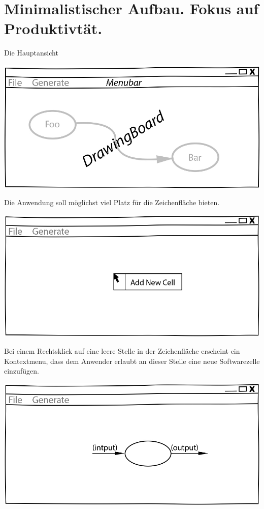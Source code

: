 \documentclass[a4paper,12pt,oneside]{book}
\begin{document}
\section{Minimalistischer Aufbau. Fokus auf Produktivtät.}
\label{sec:orgheadline22}

Die Hauptansicht

\includegraphics[width=.9\linewidth]{./img/MainCrop.jpg}

Die Anwendung soll möglichst viel Platz für die Zeichenfläche
bieten.

\includegraphics[width=.9\linewidth]{./img/ContextMenu.jpg}

Bei einem Rechtsklick auf eine leere Stelle in der Zeichenfläche erscheint ein
Kontextmenu, dass dem Anwender erlaubt an dieser Stelle eine neue Softwarezelle einzufügen.

\includegraphics[width=.9\linewidth]{./img/NewCell.jpg}
\end{document}
